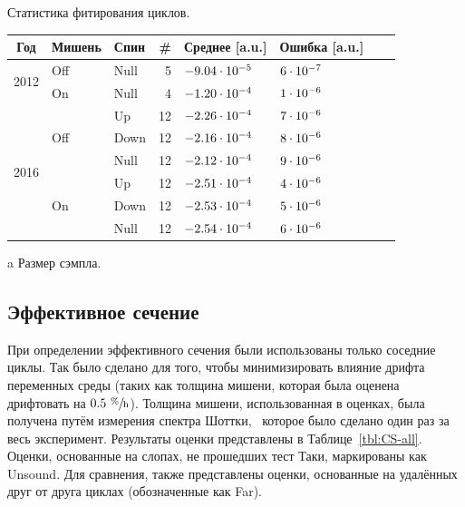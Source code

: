 \documentclass{article}
\begin{document}
	\begin{center}
			\begin{threeparttable}[h]
			\centering
			\caption{Статистика фитирования циклов. \label{tbl:Slp-big}}
			\begin{tabular}{c|llrllrr}
				\hline\hline
				         Год          & Мишень               & Спин & \#\tnote{a} & Среднее [a.u.]   & Ошибка [a.u.] &  \\ \hline
				\multirow{2}{*}{2012} & Off                  & Null &           5 & $-9.04\cdot10^{-5}$ & $6\cdot10^{-7}$  &  \\
				                      & On                   & Null &           4 & $-1.20\cdot10^{-4}$ & $1\cdot10^{-6}$  &  \\ \hline
				\multirow{6}{*}{2016} & \multirow{3}{*}{Off} & Up   &          12 & $-2.26\cdot10^{-4}$ & $7\cdot10^{-6}$  &  \\
				                      &                      & Down &          12 & $-2.16\cdot10^{-4}$ & $8\cdot10^{-6}$  &  \\
				                      &                      & Null &          12 & $-2.12\cdot10^{-4}$ & $9\cdot10^{-6}$  &  \\
				                      & \multirow{3}{*}{On}  & Up   &          12 & $-2.51\cdot10^{-4}$ & $4\cdot10^{-6}$  &  \\
				                      &                      & Down &          12 & $-2.53\cdot10^{-4}$ & $5\cdot10^{-6}$  &  \\
				                      &                      & Null &          12 & $-2.54\cdot10^{-4}$ & $6\cdot10^{-6}$  &  \\ \hline\hline
			\end{tabular}
			\begin{tablenotes}
				\item[a]{Размер сэмпла.}
			\end{tablenotes}
		\end{threeparttable}
	\end{center}
	
	\subsection{Эффективное сечение}
	
	При определении эффективного сечения были использованы только соседние циклы. Так было сделано для того, чтобы минимизировать влияние дрифта переменных среды (таких как толщина мишени, которая была оценена дрифтовать на $0.5~ \sfrac{\%}{\mathrm{h}}$). Толщина мишени, использованная в оценках, была получена путём измерения спектра Шоттки,~\cite{Stein} которое было сделано один раз за весь эксперимент. Результаты оценки представлены в Таблице~\ref{tbl:CS-all}. Оценки, основанные на слопах, не прошедших тест Таки, маркированы как Unsound. Для сравнения, также представлены оценки, основанные на удалённых друг от друга циклах (обозначенные как Far).
	
\end{document}
